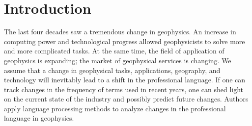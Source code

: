 \documentclass[geosciences,article,submit,moreauthors,pdftex]{Definitions/mdpi}
\begin{document}


\section{Introduction}
The last four decades saw a tremendous change in geophysics. An increase in computing power and technological progress allowed geophysicists to solve more and more complicated tasks. At the same time, the field of application of geophysics is expanding; the market of geophysical services is changing. We assume that a change in geophysical tasks, applications, geography, and technology will inevitably lead to a shift in the professional language. If one can track changes in the frequency of terms used in recent years, one can shed light on the current state of the industry and possibly predict future changes. Authors apply language processing methods to analyze changes in the professional language in geophysics.
\end{document}
